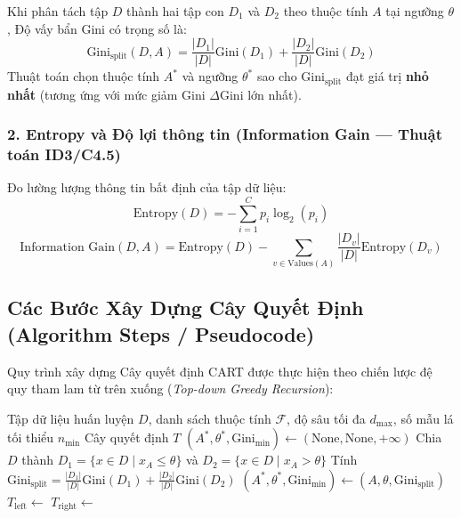 \documentclass[12pt,a4paper]{article}
\begin{document}
Khi phân tách tập $D$ thành hai tập con $D_1$ và $D_2$ theo thuộc tính $A$ tại ngưỡng $\theta$, Độ vấy bẩn Gini có trọng số là:
\begin{equation}
    \text{Gini}_{\text{split}}(D, A) = \frac{|D_1|}{|D|} \text{Gini}(D_1) + \frac{|D_2|}{|D|} \text{Gini}(D_2)
\end{equation}
Thuật toán chọn thuộc tính $A^*$ và ngưỡng $\theta^*$ sao cho $\text{Gini}_{\text{split}}$ đạt giá trị \textbf{nhỏ nhất} (tương ứng với mức giảm Gini $\Delta \text{Gini}$ lớn nhất).

\subsubsection{2. Entropy và Độ lợi thông tin (Information Gain --- Thuật toán ID3/C4.5)}
Đo lường lượng thông tin bất định của tập dữ liệu:
\begin{equation}
    \text{Entropy}(D) = - \sum_{i=1}^{C} p_i \log_2(p_i)
\end{equation}
\begin{equation}
    \text{Information Gain}(D, A) = \text{Entropy}(D) - \sum_{v \in \text{Values}(A)} \frac{|D_v|}{|D|} \text{Entropy}(D_v)
\end{equation}

\subsection{Các Bước Xây Dựng Cây Quyết Định (Algorithm Steps / Pseudocode)}
Quy trình xây dựng Cây quyết định CART được thực hiện theo chiến lược đệ quy tham lam từ trên xuống (\textit{Top-down Greedy Recursion}):

\begin{algorithm}[H]
\caption{Thuật toán Xây dựng Cây Quyết định CART Phân lớp}\label{alg:cart}
\begin{algorithmic}[1]
\Require Tập dữ liệu huấn luyện $D$, danh sách thuộc tính $\mathcal{F}$, độ sâu tối đa $d_{\max}$, số mẫu lá tối thiểu $n_{\min}$
\Ensure Cây quyết định $T$
        \State \Return {}
    \EndIf
    \State $(A^*, \theta^*, \text{Gini}_{\min}) \gets (\text{None}, \text{None}, +\infty)$
            \State Chia $D$ thành $D_1 = \{x \in D \mid x_A \le \theta\}$ và $D_2 = \{x \in D \mid x_A > \theta\}$
            \State Tính $\text{Gini}_{\text{split}} = \frac{|D_1|}{|D|} \text{Gini}(D_1) + \frac{|D_2|}{|D|} \text{Gini}(D_2)$
                \State $(A^*, \theta^*, \text{Gini}_{\min}) \gets (A, \theta, \text{Gini}_{\text{split}})$
            \EndIf
        \EndFor
    \EndFor
    \State $T_{\text{left}} \gets$ 
    \State $T_{\text{right}} \gets$ 
    \State \Return {}
\EndFunction
\end{algorithmic}
\end{algorithm}
\end{document}
